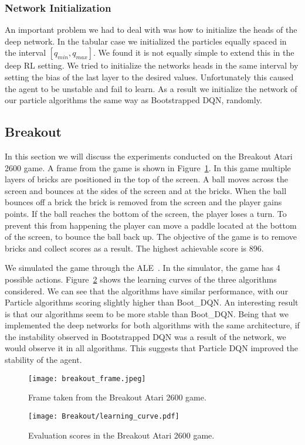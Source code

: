 \subsubsection{Network Initialization}
An important problem we had to deal with was how to initialize the heads of the deep network. In the tabular case we initialized the particles equally spaced in the interval $[q_{min},q_{max}]$. We found it is not equally simple to extend this in the deep RL setting. We tried to initialize the networks heads in the same interval by setting the bias of the last layer to the desired values. Unfortunately this caused the agent to be unstable and fail to learn. As a result we initialize the network of our particle algorithms the same way as Bootstrapped DQN, randomly.
\subsection{Breakout}
In this section we will discuss the experiments conducted on the Breakout Atari 2600 game. A frame from the game is shown in Figure~\ref{fig:breakout_frame}. In this game multiple layers of bricks are positioned in the top of the screen. A ball moves across the screen and bounces at the sides of the screen and at the bricks. When the ball bounces off a brick the brick is removed from the screen and the player gains points. If the ball reaches the bottom of the screen, the player loses a turn. To prevent this from happening the player can move a paddle located at the bottom of the screen, to bounce the ball back up. The objective of the game is to remove bricks and collect scores as a result. The highest achievable score is 896.\par
We simulated the game through the ALE~\cite{Bellemare:2013:ALE:2566972.2566979}. In the simulator, the game has 4 possible actions. Figure~\ref{fig:breakout_learning_curve} shows the learning curves of the three algorithms considered. We can see that the algorithms have similar performance, with our Particle algorithms scoring slightly higher than Boot\_DQN. An interesting result is that our algorithms seem to be more stable than Boot\_DQN. Being that we implemented the deep networks for both algorithms with the same architecture, if the instability observed in Bootstrapped DQN was a result of the network, we would observe it in all algorithms. This suggests that Particle DQN improved the stability of the agent. 
\begin{figure}
 \centering \texttt{[image: breakout\_frame.jpeg]}
 \caption{Frame taken from the Breakout Atari 2600 game.}
 \label{fig:breakout_frame}
\end{figure}
\begin{figure}
 \centering \texttt{[image: Breakout/learning\_curve.pdf]}
 \caption{Evaluation scores in the Breakout Atari 2600 game.}
 \label{fig:breakout_learning_curve}
\end{figure}
